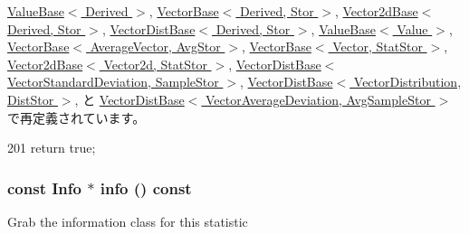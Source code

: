 \hyperlink{classStats_1_1ValueBase_a6ecddb2c44556b7acbc1723a968ff8bb}{ValueBase$<$ Derived $>$}, \hyperlink{classStats_1_1VectorBase_a6ecddb2c44556b7acbc1723a968ff8bb}{VectorBase$<$ Derived, Stor $>$}, \hyperlink{classStats_1_1Vector2dBase_a6ecddb2c44556b7acbc1723a968ff8bb}{Vector2dBase$<$ Derived, Stor $>$}, \hyperlink{classStats_1_1VectorDistBase_a6ecddb2c44556b7acbc1723a968ff8bb}{VectorDistBase$<$ Derived, Stor $>$}, \hyperlink{classStats_1_1ValueBase_a6ecddb2c44556b7acbc1723a968ff8bb}{ValueBase$<$ Value $>$}, \hyperlink{classStats_1_1VectorBase_a6ecddb2c44556b7acbc1723a968ff8bb}{VectorBase$<$ AverageVector, AvgStor $>$}, \hyperlink{classStats_1_1VectorBase_a6ecddb2c44556b7acbc1723a968ff8bb}{VectorBase$<$ Vector, StatStor $>$}, \hyperlink{classStats_1_1Vector2dBase_a6ecddb2c44556b7acbc1723a968ff8bb}{Vector2dBase$<$ Vector2d, StatStor $>$}, \hyperlink{classStats_1_1VectorDistBase_a6ecddb2c44556b7acbc1723a968ff8bb}{VectorDistBase$<$ VectorStandardDeviation, SampleStor $>$}, \hyperlink{classStats_1_1VectorDistBase_a6ecddb2c44556b7acbc1723a968ff8bb}{VectorDistBase$<$ VectorDistribution, DistStor $>$}, と \hyperlink{classStats_1_1VectorDistBase_a6ecddb2c44556b7acbc1723a968ff8bb}{VectorDistBase$<$ VectorAverageDeviation, AvgSampleStor $>$}で再定義されています。


\begin{DoxyCode}
201 { return true; }
\end{DoxyCode}
\hypertarget{classStats_1_1InfoAccess_add4438b5956a40b37420bc32c40ef50a}{
\subsubsection[{info}]{\setlength{\rightskip}{0pt plus 5cm}const {\bf Info} $\ast$ info () const}}
\label{classStats_1_1InfoAccess_add4438b5956a40b37420bc32c40ef50a}
Grab the information class for this statistic 


